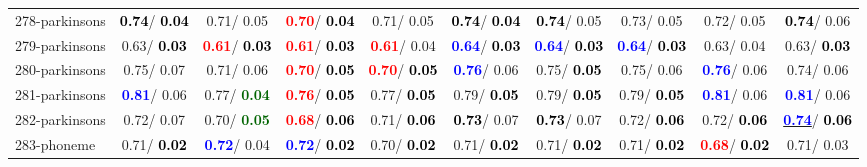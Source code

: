 \begin{table}[h]
\begin{center}
{\begin{tabular}{lc|c|c|c|c|c|c|c|c}
278-parkinsons & \textcolor{black}{\textbf{  0.74}}/\textcolor{black}{\textbf{  0.04}} &   0.71/  0.05 & \textcolor{red}{\textbf{  0.70}}/\textcolor{black}{\textbf{  0.04}} &   0.71/  0.05 & \textcolor{black}{\textbf{  0.74}}/\textcolor{black}{\textbf{  0.04}} & \textcolor{black}{\textbf{  0.74}}/  0.05 &   0.73/  0.05 &   0.72/  0.05 & \textcolor{black}{\textbf{  0.74}}/  0.06 \\
279-parkinsons &   0.63/\textcolor{black}{\textbf{  0.03}} & \textcolor{red}{\textbf{  0.61}}/\textcolor{black}{\textbf{  0.03}} & \textcolor{red}{\textbf{  0.61}}/\textcolor{black}{\textbf{  0.03}} & \textcolor{red}{\textbf{  0.61}}/  0.04 & \textcolor{blue}{\textbf{  0.64}}/\textcolor{black}{\textbf{  0.03}} & \textcolor{blue}{\textbf{  0.64}}/\textcolor{black}{\textbf{  0.03}} & \textcolor{blue}{\textbf{  0.64}}/\textcolor{black}{\textbf{  0.03}} &   0.63/  0.04 &   0.63/\textcolor{black}{\textbf{  0.03}} \\
280-parkinsons &   0.75/  0.07 &   0.71/  0.06 & \textcolor{red}{\textbf{  0.70}}/\textcolor{black}{\textbf{  0.05}} & \textcolor{red}{\textbf{  0.70}}/\textcolor{black}{\textbf{  0.05}} & \textcolor{blue}{\textbf{  0.76}}/  0.06 &   0.75/\textcolor{black}{\textbf{  0.05}} &   0.75/  0.06 & \textcolor{blue}{\textbf{  0.76}}/  0.06 &   0.74/  0.06 \\
281-parkinsons & \textcolor{blue}{\textbf{  0.81}}/  0.06 &   0.77/\textcolor{darkgreen}{\textbf{  0.04}} & \textcolor{red}{\textbf{  0.76}}/\textcolor{black}{\textbf{  0.05}} &   0.77/\textcolor{black}{\textbf{  0.05}} &   0.79/\textcolor{black}{\textbf{  0.05}} &   0.79/\textcolor{black}{\textbf{  0.05}} &   0.79/\textcolor{black}{\textbf{  0.05}} & \textcolor{blue}{\textbf{  0.81}}/  0.06 & \textcolor{blue}{\textbf{  0.81}}/  0.06 \\
282-parkinsons &   0.72/  0.07 &   0.70/\textcolor{darkgreen}{\textbf{  0.05}} & \textcolor{red}{\textbf{  0.68}}/\textcolor{black}{\textbf{  0.06}} &   0.71/\textcolor{black}{\textbf{  0.06}} & \textcolor{black}{\textbf{  0.73}}/  0.07 & \textcolor{black}{\textbf{  0.73}}/  0.07 &   0.72/\textcolor{black}{\textbf{  0.06}} &   0.72/\textcolor{black}{\textbf{  0.06}} & \underline{\textcolor{blue}{\textbf{  0.74}}}/\textcolor{black}{\textbf{  0.06}} \\
283-phoneme &   0.71/\textcolor{black}{\textbf{  0.02}} & \textcolor{blue}{\textbf{  0.72}}/  0.04 & \textcolor{blue}{\textbf{  0.72}}/\textcolor{black}{\textbf{  0.02}} &   0.70/\textcolor{black}{\textbf{  0.02}} &   0.71/\textcolor{black}{\textbf{  0.02}} &   0.71/\textcolor{black}{\textbf{  0.02}} &   0.71/\textcolor{black}{\textbf{  0.02}} & \textcolor{red}{\textbf{  0.68}}/\textcolor{black}{\textbf{  0.02}} &   0.71/  0.03 \\

\end{tabular}}
\end{center}
\end{table}
